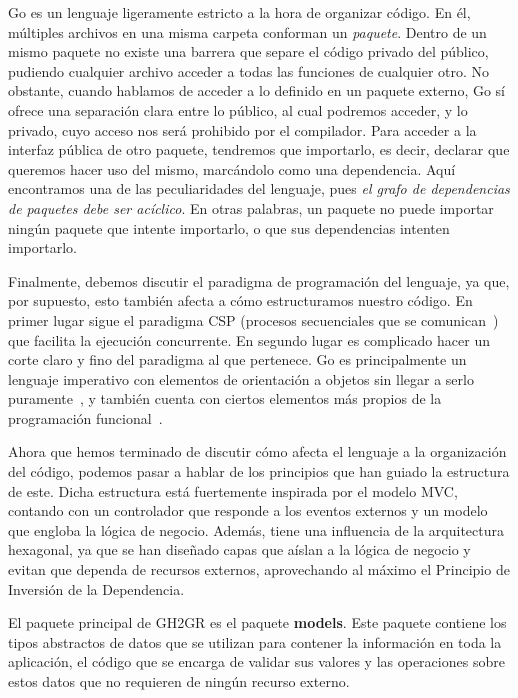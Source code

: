Go es un lenguaje ligeramente estricto a la hora de organizar código. En él, múltiples archivos en una misma carpeta conforman un {\it paquete}. Dentro de un mismo paquete no existe una barrera que separe el código privado del público, pudiendo cualquier archivo acceder a todas las funciones de cualquier otro. No obstante, cuando hablamos de acceder a lo definido en un paquete externo, Go sí ofrece una separación clara entre lo público, al cual podremos acceder, y lo privado, cuyo acceso nos será prohibido por el compilador. Para acceder a la interfaz pública de otro paquete, tendremos que importarlo, es decir, declarar que queremos hacer uso del mismo, marcándolo como una dependencia. Aquí encontramos una de las peculiaridades del lenguaje, pues {\it el grafo de dependencias de paquetes debe ser acíclico}. En otras palabras, un paquete no puede importar ningún paquete que intente importarlo, o que sus dependencias intenten importarlo.

Finalmente, debemos discutir el paradigma de programación del lenguaje, ya que, por supuesto, esto también afecta a cómo estructuramos nuestro código. En primer lugar sigue el paradigma CSP (procesos secuenciales que se comunican~\cite{hoare1985communicating}) que facilita la ejecución concurrente. En segundo lugar es complicado hacer un corte claro y fino del paradigma al que pertenece. 
Go es principalmente un lenguaje imperativo con elementos de orientación a objetos sin llegar a serlo puramente~\cite{goFAQOOP}, 
y también cuenta con ciertos elementos más propios de la programación funcional~\cite{goCodewalkFirstClass}.

Ahora que hemos terminado de discutir cómo afecta el lenguaje a la organización del código, podemos pasar a hablar de los principios que han guiado la estructura de este. Dicha estructura está fuertemente inspirada por el modelo \acrshort{MVC}\cite{universitetetiosloTrygveMVC}, contando con un controlador que responde a los eventos externos y un modelo que engloba la lógica de negocio. Además, tiene una influencia de la arquitectura hexagonal\cite{cockburnHexagonalArchitecture}, ya que se han diseñado capas que aíslan a la lógica de negocio y evitan que dependa de recursos externos, aprovechando al máximo el Principio de Inversión de la Dependencia\cite{Martin2002-yw}.

El paquete principal de GH2GR es el paquete \textbf{models}. Este paquete contiene los tipos abstractos de datos que se utilizan para contener la información en toda la aplicación, el código que se encarga de validar sus valores y las operaciones sobre estos datos que no requieren de ningún recurso externo.

